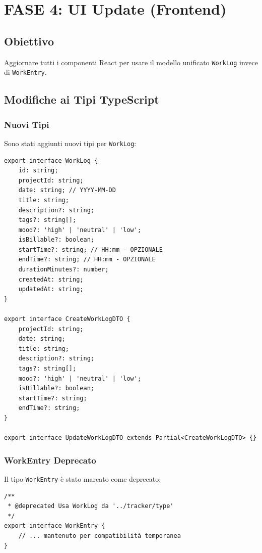 \documentclass[11pt,a4paper]{article}
\begin{document}
\section{FASE 4: UI Update (Frontend)}

\subsection{Obiettivo}

Aggiornare tutti i componenti React per usare il modello unificato \texttt{WorkLog} invece di \texttt{WorkEntry}.

\subsection{Modifiche ai Tipi TypeScript}

\subsubsection{Nuovi Tipi}

Sono stati aggiunti nuovi tipi per \texttt{WorkLog}:

\begin{lstlisting}[caption=Tipi WorkLog]
export interface WorkLog {
    id: string;
    projectId: string;
    date: string; // YYYY-MM-DD
    title: string;
    description?: string;
    tags?: string[];
    mood?: 'high' | 'neutral' | 'low';
    isBillable?: boolean;
    startTime?: string; // HH:mm - OPZIONALE
    endTime?: string; // HH:mm - OPZIONALE
    durationMinutes?: number;
    createdAt: string;
    updatedAt: string;
}

export interface CreateWorkLogDTO {
    projectId: string;
    date: string;
    title: string;
    description?: string;
    tags?: string[];
    mood?: 'high' | 'neutral' | 'low';
    isBillable?: boolean;
    startTime?: string;
    endTime?: string;
}

export interface UpdateWorkLogDTO extends Partial<CreateWorkLogDTO> {}
\end{lstlisting}

\subsubsection{WorkEntry Deprecato}

Il tipo \texttt{WorkEntry} è stato marcato come deprecato:

\begin{lstlisting}[caption=WorkEntry Deprecato]
/**
 * @deprecated Usa WorkLog da '../tracker/type'
 */
export interface WorkEntry {
    // ... mantenuto per compatibilità temporanea
}
\end{lstlisting}
\end{document}
